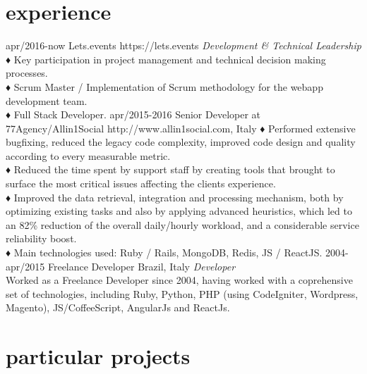 \documentclass[]{friggeri-cv} %
\begin{document}

\section{experience}
\begin{entrylist}
\entry
{apr/2016-now}
{Lets.events}
{https://lets.events}
{\emph{Development \& Technical Leadership} \\
♦ Key participation in project management and technical decision making processes.\\
♦ Scrum Master / Implementation of Scrum methodology for the webapp development team.\\
♦ Full Stack Developer.
}
\entry
{apr/2015-2016}
{Senior Developer at 77Agency/Allin1Social}
{http://www.allin1social.com, Italy}
{
♦ Performed extensive bugfixing, reduced the legacy code complexity, improved
code design and quality according to every measurable metric. \\
♦ Reduced the time spent by support staff by creating tools that brought to
surface the most critical issues affecting the clients experience.\\
♦ Improved the data retrieval, integration and processing mechanism,
both by optimizing existing tasks and also by applying advanced heuristics,
which led to an 82\% reduction of the overall daily/hourly workload, and
a considerable service reliability boost.\\
♦ Main technologies used: Ruby / Rails, MongoDB, Redis, JS / ReactJS.
}
\entry
{2004-apr/2015}
{Freelance Developer}
{Brazil, Italy}
{\emph{Developer} \\ Worked as a Freelance Developer since 2004, having
worked with a coprehensive set of technologies, including Ruby, Python, PHP (using CodeIgniter, Wordpress, Magento), JS/CoffeeScript, AngularJs and ReactJs.
}
\end{entrylist}


\section{particular projects}
\end{document}
